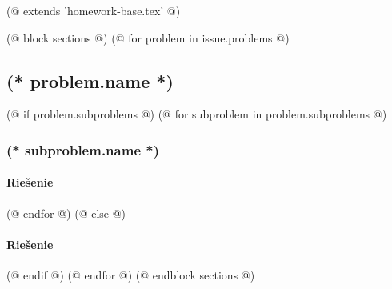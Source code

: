 (@ extends 'homework-base.tex' @)

(@ block sections @)
    (@ for problem in issue.problems @)
        \subsection{(* problem.name *)}
        (@ if problem.subproblems @)
            (@ for subproblem in problem.subproblems @)
                \subsubsection{(* subproblem.name *)}
                \paragraph{Riešenie}
            (@ endfor @)
        (@ else @)
            \paragraph{Riešenie}
        (@ endif @)
    (@ endfor @)
(@ endblock sections @)
